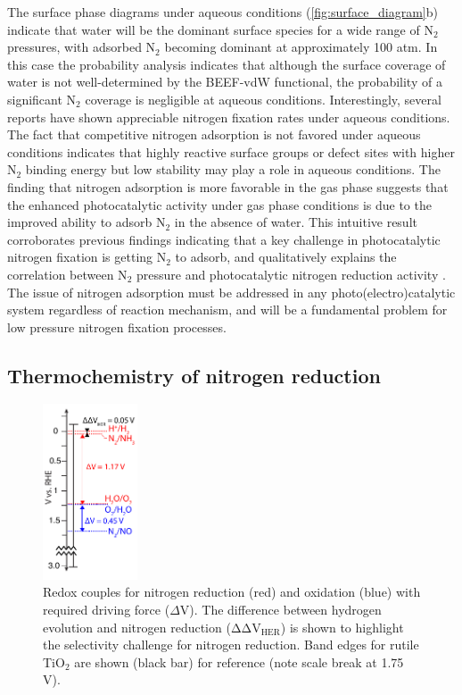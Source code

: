\documentclass[journal=ascecg,manuscript=article,articletitle=true]{achemso}
\begin{document}
The surface phase diagrams under aqueous conditions (\ref{fig:surface_diagram}b) indicate that water will be the dominant surface species for a wide range of N$_2$ pressures, with adsorbed N$_2$ becoming dominant at approximately 100 atm. In this case the probability analysis indicates that although the surface coverage of water is not well-determined by the BEEF-vdW functional, the probability of a significant N$_2$ coverage is negligible at aqueous conditions. Interestingly, several reports have shown appreciable nitrogen fixation rates under aqueous conditions. \cite{Augugliaro_1982,Hirakawa_2017} The fact that competitive nitrogen adsorption is not favored under aqueous conditions indicates that highly reactive surface groups or defect sites with higher N$_2$ binding energy but low stability may play a role in aqueous conditions. The finding that nitrogen adsorption is more favorable in the gas phase suggests that the enhanced photocatalytic activity under gas phase conditions is due to the improved ability to adsorb N$_2$ in the absence of water. This intuitive result corroborates previous findings indicating that a key challenge in photocatalytic nitrogen fixation is getting N$_2$ to adsorb\cite{Zhu_2013,Vettraino_2002,Schrauzer_2011}, and qualitatively explains the  correlation between N$_2$ pressure and photocatalytic nitrogen reduction activity \cite{Schrauzer_2011,Ali_2016}. The issue of nitrogen adsorption must be addressed in any photo(electro)catalytic system regardless of reaction mechanism, and will be a fundamental problem for low pressure nitrogen fixation processes.

\subsection{Thermochemistry of nitrogen reduction}

\begin{figure}[h]
\centering

\includegraphics[width=0.25\textwidth]{figures/N2_redox_ladder.pdf}
\caption{Redox couples for nitrogen reduction (red) and oxidation (blue) with required driving force ($\Delta$V). The difference between hydrogen evolution and nitrogen reduction ($\mathrm{\Delta \Delta V_{HER}}$) is shown to highlight the selectivity challenge for nitrogen reduction. Band edges for rutile TiO$_2$ are shown (black bar) for reference (note scale break at 1.75 V).}
\label{fig:redox_ladder}
\end{figure}
\end{document}
